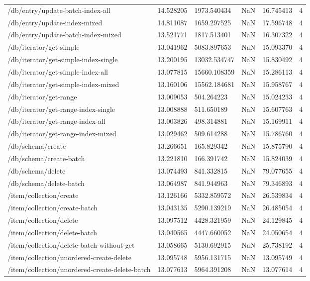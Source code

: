 \begin{tabularx}{\linewidth}{XXXXXX}
/db/entry/update-batch-index-all & 14.528205 & 1973.540434 & NaN & 16.745413 & 4 \\
/db/entry/update-index-mixed & 14.811087 & 1659.297525 & NaN & 17.596748 & 4 \\
/db/entry/update-batch-index-mixed & 13.521771 & 1817.513401 & NaN & 16.307322 & 4 \\
/db/iterator/get-simple & 13.041962 & 5083.897653 & NaN & 15.093370 & 4 \\
/db/iterator/get-simple-index-single & 13.200195 & 13032.534747 & NaN & 15.830492 & 4 \\
/db/iterator/get-simple-index-all & 13.077815 & 15660.108359 & NaN & 15.286113 & 4 \\
/db/iterator/get-simple-index-mixed & 13.160106 & 15562.184681 & NaN & 15.958767 & 4 \\
/db/iterator/get-range & 13.009053 & 504.264223 & NaN & 15.024233 & 4 \\
/db/iterator/get-range-index-single & 13.008888 & 511.650189 & NaN & 15.607763 & 4 \\
/db/iterator/get-range-index-all & 13.003826 & 498.314881 & NaN & 15.169911 & 4 \\
/db/iterator/get-range-index-mixed & 13.029462 & 509.614288 & NaN & 15.786760 & 4 \\
/db/schema/create & 13.266651 & 165.829342 & NaN & 15.875790 & 4 \\
/db/schema/create-batch & 13.221810 & 166.391742 & NaN & 15.824039 & 4 \\
/db/schema/delete & 13.074493 & 841.332815 & NaN & 79.077655 & 4 \\
/db/schema/delete-batch & 13.064987 & 841.944963 & NaN & 79.346893 & 4 \\
/item/collection/create & 13.126166 & 5332.859572 & NaN & 26.539834 & 4 \\
/item/collection/create-batch & 13.043135 & 5290.139219 & NaN & 26.485054 & 4 \\
/item/collection/delete & 13.097512 & 4428.321959 & NaN & 24.129845 & 4 \\
/item/collection/delete-batch & 13.040565 & 4447.660052 & NaN & 24.050654 & 4 \\
/item/collection/delete-batch-without-get & 13.058665 & 5130.692915 & NaN & 25.738192 & 4 \\
/item/collection/unordered-create-delete & 13.095748 & 5956.131715 & NaN & 13.095749 & 4 \\
/item/collection/unordered-create-delete-batch & 13.077613 & 5964.391208 & NaN & 13.077614 & 4 \\

\end{tabularx}
